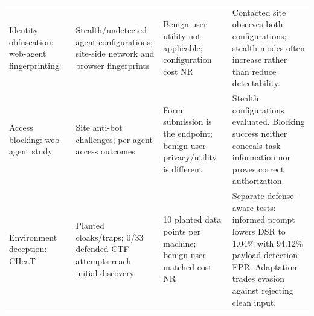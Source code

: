 \begin{table}[t]
\begin{tabularx}{\textwidth}{@{}P{.19\textwidth}P{.22\textwidth}P{.19\textwidth}Y@{}}
Identity obfuscation: web-agent fingerprinting~\cite[Secs.~6--7]{fayolle2026webagents} & Stealth/undetected agent configurations; site-side network and browser fingerprints & Benign-user utility not applicable; configuration cost NR & Contacted site observes both configurations; stealth modes often increase rather than reduce detectability. \\\addlinespace[3pt]
Access blocking: web-agent study~\cite[Secs.~5--8]{fayolle2026webagents} & Site anti-bot challenges; per-agent access outcomes & Form submission is the endpoint; benign-user privacy/utility is different & Stealth configurations evaluated. Blocking success neither conceals task information nor proves correct authorization. \\\addlinespace[3pt]
Environment deception: CHeaT~\cite[Secs.~6.2,7]{ayzenshteyn2025cheat} & Planted cloaks/traps; 0/33 defended CTF attempts reach initial discovery & 10 planted data points per machine; benign-user matched cost NR & Separate defense-aware tests: informed prompt lowers DSR to 1.04\% with 94.12\% payload-detection FPR. Adaptation trades evasion against rejecting clean input. \\\bottomrule
\end{tabularx}\end{table}
